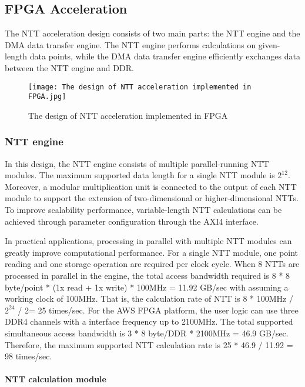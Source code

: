 \subsection{FPGA Acceleration}\label{section: fpga-acceleration}

The NTT acceleration design consists of two main parts: the NTT engine and the DMA data transfer engine. The NTT engine performs calculations on given-length data points, while the DMA data transfer engine efficiently exchanges data between the NTT engine and DDR.

\begin{figure}[ht]
  \centering
  \texttt{[image: The design of NTT acceleration implemented in FPGA.jpg]}
  \caption{The design of NTT acceleration implemented in FPGA}
  \label{fig:The design of NTT acceleration implemented in FPGA}
\end{figure}

\subsubsection{NTT engine}

In this design, the NTT engine consists of multiple parallel-running NTT modules. The maximum supported data length for a single NTT module is $2^{12}$. Moreover, a  modular multiplication unit is connected to the output of each NTT module to support the extension of two-dimensional or higher-dimensional NTTs. To improve scalability performance, variable-length NTT calculations can be achieved through parameter configuration through the AXI4 interface.

In practical applications, processing in parallel with multiple NTT modules can greatly improve computational performance. For a single NTT module, one point reading and one storage operation are required per clock cycle. When 8 NTTs are processed in parallel in the engine, the total access bandwidth required is 8 * 8 byte/point * (1x read + 1x write) * 100MHz = 11.92 GB/sec with assuming a working clock of 100MHz. That is, the calculation rate of NTT is 8 * 100MHz / $2^{24}$ / 2= 25 times/sec. For the AWS FPGA platform, the user logic can use three DDR4 channels with a interface frequency up to 2100MHz. The total supported simultaneous access bandwidth is 3 * 8 byte/DDR * 2100MHz = 46.9 GB/sec. Therefore, the maximum supported NTT calculation rate is 25 * 46.9 / 11.92 = 98 times/sec.


\paragraph{NTT calculation module}


